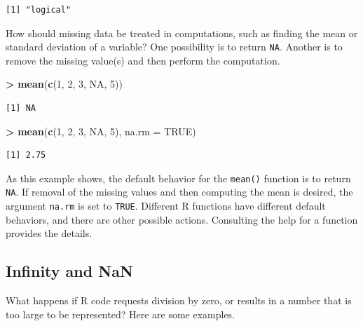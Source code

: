 \documentclass[]{krantz}
\makeatletter
\newenvironment{Shaded}{\begin{snugshade}}{\end{snugshade}}
\newcommand{\DataTypeTok}[1]{\textcolor[rgb]{0.27,0.27,0.27}{#1}}
\newcommand{\DecValTok}[1]{\textcolor[rgb]{0.06,0.06,0.06}{#1}}
\newcommand{\KeywordTok}[1]{\textcolor[rgb]{0.27,0.27,0.27}{\textbf{#1}}}
\newcommand{\NormalTok}[1]{#1}
\newcommand{\OperatorTok}[1]{\textcolor[rgb]{0.43,0.43,0.43}{\textbf{#1}}}
\newcommand{\OtherTok}[1]{\textcolor[rgb]{0.37,0.37,0.37}{#1}}
\newcommand{\StringTok}[1]{\textcolor[rgb]{0.5,0.5,0.5}{#1}}
\newenvironment{kframe}{%
\medskip{}
\setlength{\fboxsep}{.8em}
 \def\at@end@of@kframe{}%
 \ifinner\ifhmode%
  \def\at@end@of@kframe{\end{minipage}}%
  \begin{minipage}{\columnwidth}%
 \fi\fi%
 \def\FrameCommand##1{\hskip\@totalleftmargin \hskip-\fboxsep
 \colorbox{shadecolor}{##1}\hskip-\fboxsep
     \hskip-\linewidth \hskip-\@totalleftmargin \hskip\columnwidth}%
 \MakeFramed {\advance\hsize-\width
   \@totalleftmargin\z@ \linewidth\hsize
   \@setminipage}}%
 {\par\unskip\endMakeFramed%
 \at@end@of@kframe}
\renewenvironment{Shaded}{\begin{kframe}}{\end{kframe}}
\makeatother
\begin{document}
\begin{verbatim}
[1] "logical"
\end{verbatim}

How should missing data be treated in computations, such as finding the mean or standard deviation of a variable? One possibility is to return \texttt{NA}. Another is to remove the missing value(s) and then perform the computation.

\begin{Shaded}
\begin{Highlighting}[]
\OperatorTok{>}\StringTok{ }\KeywordTok{mean}\NormalTok{(}\KeywordTok{c}\NormalTok{(}\DecValTok{1}\NormalTok{, }\DecValTok{2}\NormalTok{, }\DecValTok{3}\NormalTok{, }\OtherTok{NA}\NormalTok{, }\DecValTok{5}\NormalTok{))}
\end{Highlighting}
\end{Shaded}

\begin{verbatim}
[1] NA
\end{verbatim}

\begin{Shaded}
\begin{Highlighting}[]
\OperatorTok{>}\StringTok{ }\KeywordTok{mean}\NormalTok{(}\KeywordTok{c}\NormalTok{(}\DecValTok{1}\NormalTok{, }\DecValTok{2}\NormalTok{, }\DecValTok{3}\NormalTok{, }\OtherTok{NA}\NormalTok{, }\DecValTok{5}\NormalTok{), }\DataTypeTok{na.rm =} \OtherTok{TRUE}\NormalTok{)}
\end{Highlighting}
\end{Shaded}

\begin{verbatim}
[1] 2.75
\end{verbatim}

As this example shows, the default behavior for the \texttt{mean()} function is to return \texttt{NA}. If removal of the missing values and then computing the mean is desired, the argument \texttt{na.rm} is set to \texttt{TRUE}. Different R functions have different default behaviors, and there are other possible actions. Consulting the help for a function provides the details.

\hypertarget{infinity-and-nan}{%
\subsection{Infinity and NaN}\label{infinity-and-nan}}

What happens if R code requests division by zero, or results in a number that is too large to be represented? Here are some examples.
\end{document}
